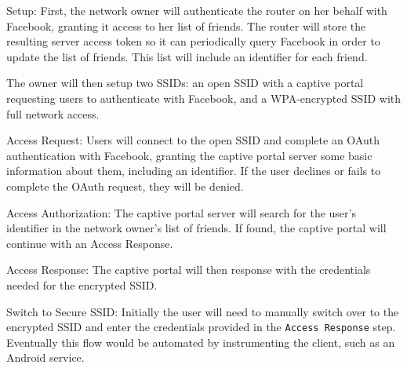 \begin{description}
\item{Setup:} First, the network owner will authenticate the router on her behalf with Facebook,
granting it access to her list of friends. The router will store the resulting server access token
so it can periodically query Facebook in order to update the list of friends. This list will include
an identifier for each friend.

The owner will then setup two SSIDs: an open SSID with a captive portal requesting users to
authenticate with Facebook, and a WPA-encrypted SSID with full network access.

\item{Access Request:} Users will connect to the open SSID and complete an OAuth authentication with
Facebook, granting the captive portal server some basic information about them, including an
identifier. If the user declines or fails to complete the OAuth request, they will be denied.

\item{Access Authorization:} The captive portal server will search for the user's identifier in the
network owner's list of friends. If found, the captive portal will continue with an Access Response.

\item{Access Response:} The captive portal will then response with the credentials needed for the
encrypted SSID.

\item{Switch to Secure SSID:} Initially the user will need to manually switch over to the encrypted
SSID and enter the credentials provided in the \texttt{Access Response} step. Eventually this flow
would be automated by instrumenting the client, such as an Android service.
\end{description}